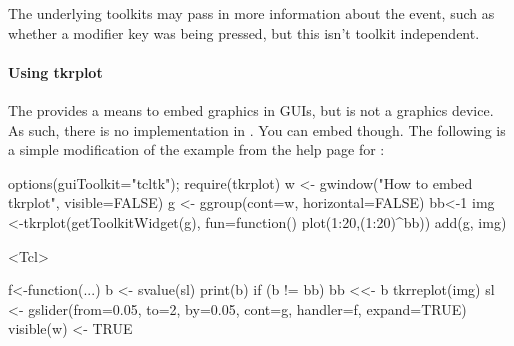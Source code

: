 The underlying toolkits may pass in more information about the event,
such as whether a modifier key was being pressed, but this isn't
toolkit independent.

\paragraph{Using tkrplot} The  provides a means to embed
graphics in  GUIs, but is not a graphics device. As such,
there is no  implementation in
. You can embed  though. The
following is a simple modification of the example from the help page for :

\begin{Schunk}
\begin{Sinput}
 options(guiToolkit="tcltk"); require(tkrplot)
 w <- gwindow("How to embed tkrplot", visible=FALSE)
 g <- ggroup(cont=w, horizontal=FALSE)
 bb<-1
 img <-tkrplot(getToolkitWidget(g), 
               fun=function() plot(1:20,(1:20)^bb))
 add(g, img)
\end{Sinput}
\begin{Soutput}
<Tcl>  
\end{Soutput}
\begin{Sinput}
 f<-function(...) {
   b <- svalue(sl)
   print(b)
   if (b != bb) {
     bb <<- b
     tkrreplot(img)
   }
 }
 sl <- gslider(from=0.05, to=2, by=0.05, cont=g, 
               handler=f, expand=TRUE)
 visible(w) <- TRUE
 
\end{Sinput}
\end{Schunk}


